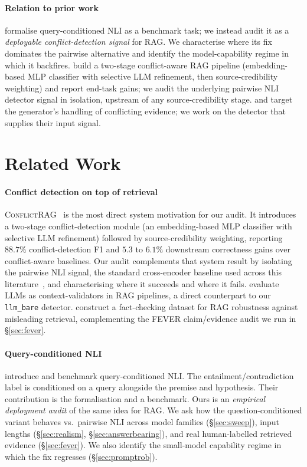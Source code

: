 \documentclass[sigconf, nonacm, natbib]{acmart}
\begin{document}
\paragraph{Relation to prior work}
\citet{canby2025qnli} formalise query-conditioned NLI as a benchmark task; we instead
audit it as a \emph{deployable conflict-detection signal} for RAG. We characterise where
its fix dominates the pairwise alternative and identify the model-capability regime in
which it backfires. \citet{conflictrag2025} build a two-stage conflict-aware RAG pipeline
(embedding-based MLP classifier with selective LLM refinement, then source-credibility
weighting) and report end-task gains; we audit the underlying pairwise NLI detector
signal in isolation, upstream of any source-credibility stage. \citet{conqret2025} and
\citet{madamrag2025} target the generator's handling of conflicting evidence; we work on
the detector that supplies their input signal.

\section{Related Work}
\label{sec:related}

\paragraph{Conflict detection on top of retrieval}
\textsc{ConflictRAG}~\citep{conflictrag2025} is the most direct system motivation for
our audit. It introduces a two-stage conflict-detection module (an embedding-based MLP
classifier with selective LLM refinement) followed by source-credibility weighting,
reporting $88.7\%$ conflict-detection F1 and $5.3$ to $6.1\%$ downstream correctness
gains over conflict-aware baselines. Our audit complements that system result by
isolating the pairwise NLI signal, the standard cross-encoder baseline used across this
literature~\citep{madamrag2025,contradetect2025}, and characterising where it succeeds
and where it fails. \citet{contradetect2025} evaluate LLMs as context-validators in RAG
pipelines, a direct counterpart to our \texttt{llm\_bare} detector.
\citet{worsezero2025} construct a fact-checking dataset for RAG robustness against
misleading retrieval, complementing the FEVER claim/evidence audit we run in
\S\ref{sec:fever}.

\paragraph{Query-conditioned NLI}
\citet{canby2025qnli} introduce and benchmark query-conditioned NLI. The
entailment/contradiction label is conditioned on a query alongside the premise and
hypothesis. Their contribution is the formalisation and a benchmark. Ours is an
\emph{empirical deployment audit} of the same idea for RAG. We ask how the
question-conditioned variant behaves vs.\ pairwise NLI across model families
(\S\ref{sec:sweep}), input lengths (\S\ref{sec:realism}, \S\ref{sec:answerbearing}), and
real human-labelled retrieved evidence (\S\ref{sec:fever}). We also identify the
small-model capability regime in which the fix regresses (\S\ref{sec:promptrob}).
\end{document}
